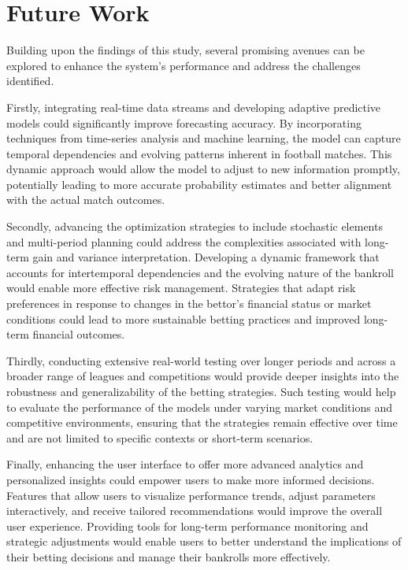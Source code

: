 \section{Future Work}

Building upon the findings of this study, several promising avenues can be explored to enhance the system's performance and address the challenges identified. 

Firstly, integrating real-time data streams and developing adaptive predictive models could significantly improve forecasting accuracy. By incorporating techniques from time-series analysis and machine learning, the model can capture temporal dependencies and evolving patterns inherent in football matches. This dynamic approach would allow the model to adjust to new information promptly, potentially leading to more accurate probability estimates and better alignment with the actual match outcomes.

Secondly, advancing the optimization strategies to include stochastic elements and multi-period planning could address the complexities associated with long-term gain and variance interpretation. Developing a dynamic framework that accounts for intertemporal dependencies and the evolving nature of the bankroll would enable more effective risk management. Strategies that adapt risk preferences in response to changes in the bettor's financial status or market conditions could lead to more sustainable betting practices and improved long-term financial outcomes.

Thirdly, conducting extensive real-world testing over longer periods and across a broader range of leagues and competitions would provide deeper insights into the robustness and generalizability of the betting strategies. Such testing would help to evaluate the performance of the models under varying market conditions and competitive environments, ensuring that the strategies remain effective over time and are not limited to specific contexts or short-term scenarios.

Finally, enhancing the user interface to offer more advanced analytics and personalized insights could empower users to make more informed decisions. Features that allow users to visualize performance trends, adjust parameters interactively, and receive tailored recommendations would improve the overall user experience. Providing tools for long-term performance monitoring and strategic adjustments would enable users to better understand the implications of their betting decisions and manage their bankrolls more effectively.

